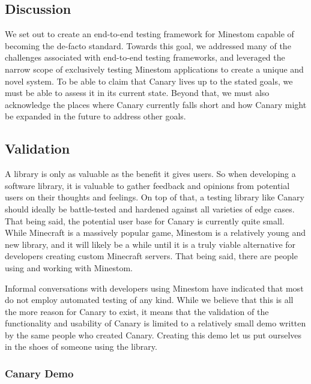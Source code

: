 \documentclass[12pt]{article}
\begin{document}
\begin{onehalfspacing}

\newpage
\section{Discussion}

We set out to create an end-to-end testing framework for Minestom
capable of becoming the de-facto standard. Towards this goal, we
addressed many of the challenges associated with end-to-end testing
frameworks, and leveraged the narrow scope of exclusively testing
Minestom applications to create a unique and novel system. To be able to
claim that Canary lives up to the stated goals, we must be able to
assess it in its current state. Beyond that, we must also acknowledge
the places where Canary currently falls short and how Canary might be
expanded in the future to address other goals.

\subsection{Validation}

A library is only as valuable as the benefit it gives users. So when
developing a software library, it is valuable to gather feedback and
opinions from potential users on their thoughts and feelings. On top of
that, a testing library like Canary should ideally be battle-tested and
hardened against all varieties of edge cases. That being said, the
potential user base for Canary is currently quite small. While Minecraft
is a massively popular game, Minestom is a relatively young and new
library, and it will likely be a while until it is a truly viable
alternative for developers creating custom Minecraft servers. That being
said, there are people using and working with Minestom.

Informal conversations with developers using Minestom have indicated
that most do not employ automated testing of any kind. While we believe
that this is all the more reason for Canary to exist, it means that the
validation of the functionality and usability of Canary is limited to a
relatively small demo written by the same people who created Canary.
Creating this demo let us put ourselves in the shoes of someone using
the library.

\subsubsection{Canary Demo}


\end{onehalfspacing}
\end{document}
